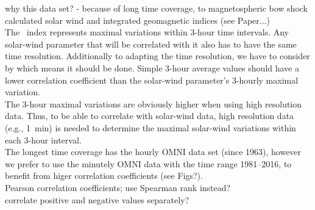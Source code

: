 why this data set? - because of long time coverage, to magnetospheric bow shock calculated solar wind and integrated geomagnetic indices (see Paper...)\\

The \Kp{}~index represents maximal variations within 3-hour time intervals. Any solar-wind parameter that will be correlated with it also has to have the same time resolution. Additionally to adapting the time resolution, we have to consider by which means it should be done. Simple 3-hour average values should have a lower correlation coefficient than the solar-wind parameter's 3-hourly maximal variation.\\

The 3-hour maximal variations are obviously higher when using high resolution data. Thus, to be able to correlate \Kp{} with solar-wind data, high resolution data (e.g., 1~min) is needed to determine the maximal solar-wind variations within each 3-hour interval.\\

The longest time coverage has the hourly OMNI data set (since 1963), however we prefer to use the minutely OMNI data with the time range 1981--2016, to benefit from higer correlation coefficients (see Figs?).\\


Pearson correlation coefficients; use Spearman rank instead?\\
correlate positive and negative values separately?\\

